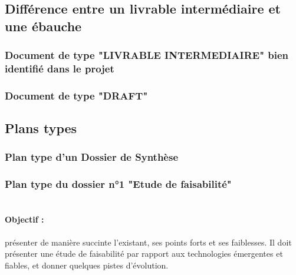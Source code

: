   \subsection{Différence entre un livrable intermédiaire et une ébauche}     
    \subsubsection{Document de type "LIVRABLE INTERMEDIAIRE" bien identifié dans le projet}
    \subsubsection{Document de type "DRAFT"}
  \subsection{Plans types}     
    \subsubsection{Plan type d'un Dossier de Synthèse}
    
    \subsubsection{Plan type du dossier n°1 "Etude de faisabilité"}
      \paragraph*{\\Objectif :}
        présenter de manière succinte l'existant, ses points forts et ses faiblesses. Il doit
        présenter une étude de faisabilité par rapport aux technologies émergentes et fiables, et donner quelques pistes d'évolution.
